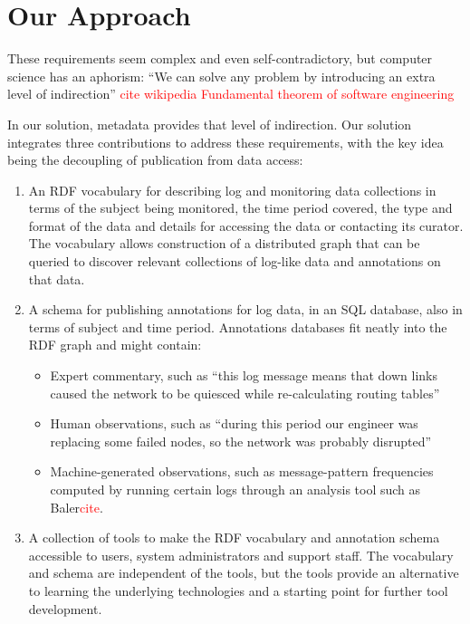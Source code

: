 \section{Our Approach}
\label{s:solution}

These requirements seem complex and even self-contradictory, but
computer science has an aphorism: ``We can solve any problem by
introducing an extra level of indirection''
 \textcolor{red}{cite wikipedia Fundamental theorem of software engineering}

In our solution, metadata provides that level of indirection.
Our solution integrates three contributions to address these
requirements, with the key idea being the decoupling of publication
from data access:

\begin{enumerate}
\item An RDF vocabulary for describing log and monitoring data collections
      in terms of the subject being monitored, the time period covered,
      the type and format of the data and details for accessing the data or
      contacting its curator. The vocabulary allows construction of a 
      distributed graph that can be queried to discover relevant collections
      of log-like data and annotations on that data.
      
\item A schema for publishing annotations for log data, in an SQL
	  database, also in terms of subject and time period. Annotations 
      databases fit neatly into the RDF graph and might contain:
      
\begin{itemize}
\item Expert commentary, such as ``this log message means that down links
      caused the network to be quiesced while re-calculating routing tables''      
\item Human observations, such as ``during this period our engineer was 
      replacing some failed nodes, so the network was probably disrupted'' 
\item Machine-generated observations, such as message-pattern frequencies 
      computed by running certain logs through an analysis tool such as 
      Baler\textcolor{red}{cite}.
\end{itemize}

\item A collection of tools to make the RDF vocabulary and annotation 
      schema accessible to users, system administrators and support staff.
      The vocabulary and schema are independent of the tools, but 
      the tools provide an alternative to learning the underlying 
      technologies and a starting point for further tool development.

\end{enumerate}









